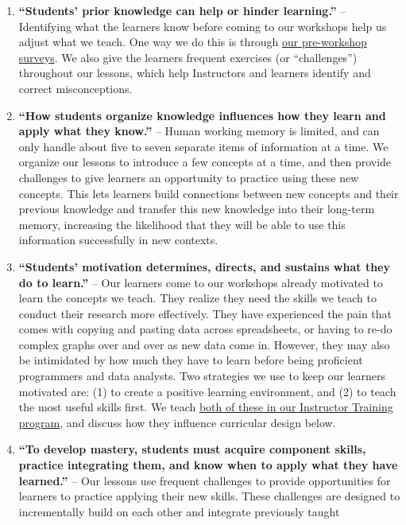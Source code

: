 \documentclass[]{book}
\providecommand{\tightlist}{%
  \setlength{\itemsep}{0pt}\setlength{\parskip}{0pt}}
\begin{document}
\begin{enumerate}
\def\labelenumi{\arabic{enumi}.}
\tightlist
\item
  \textbf{``Students' prior knowledge can help or hinder learning.''} -- Identifying
  what the learners know before coming to our workshops help us adjust what we
  teach. One way we do this is through \href{https://carpentries.org/assessment/}{our pre-workshop surveys}. We also give the learners
  frequent exercises (or ``challenges'') throughout our lessons, which help Instructors
  and learners identify and correct misconceptions.
\item
  \textbf{``How students organize knowledge influences how they learn and apply what
  they know.''} -- Human working memory is limited, and can only handle about
  five to seven separate items of information at a time. We organize our lessons
  to introduce a few concepts at a time, and then provide challenges to give learners
  an opportunity to practice using these new concepts. This lets learners build connections
  between new concepts and their previous knowledge and transfer this new
  knowledge into their long-term memory,
  increasing the likelihood that they will be able to use this information successfully
  in new contexts.
\item
  \textbf{``Students' motivation determines, directs, and sustains what they do to
  learn.''} -- Our learners come to our workshops already motivated to learn the concepts
  we teach. They realize they need the skills we teach to conduct their
  research more effectively. They have experienced the pain that comes with
  copying and pasting data across spreadsheets, or having to re-do complex
  graphs over and over as new data come in. However, they may also be
  intimidated by how much they have to learn before being proficient
  programmers and data analysts. Two strategies we use to keep our
  learners motivated
  are: (1) to create a positive learning environment, and (2) to teach the most
  useful skills first. We teach \href{https://carpentries.github.io/instructor-training/08-motivation/index.html}{both of these in our Instructor Training program},
  and discuss how they influence curricular design below.
\item
  \textbf{``To develop mastery, students must acquire component skills, practice
  integrating them, and know when to apply what they have learned.''} --
  Our lessons use frequent challenges to provide
  opportunities for learners to practice applying their new skills. These challenges
  are designed to incrementally build on each other and integrate previously taught

\end{enumerate}
\end{document}
